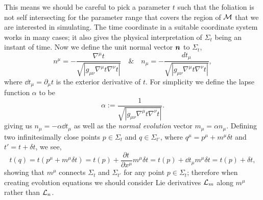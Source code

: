 This means we should be careful to pick a parameter $t$ such that the foliation is not self intersecting for the parameter range that covers the region of $\mathcal{M}$ that we are interested in simulating. The time coordinate in a suitable coordinate system works in many cases; it also gives the physical interpretation of $\Sigma_t$ being an instant of time. Now we define the unit normal vector $\boldsymbol{n}$ to $\Sigma_t$,
\begin{equation} n^\mu = -\frac{\nabla^\mu t}{\sqrt{|g_{\mu\nu}\nabla^\mu t \nabla^\nu t|}} \quad \& \quad  n_\mu = -\frac{dt_\mu}{\sqrt{|g_{\mu\nu}\nabla^\mu t \nabla^\nu t|}},\end{equation}
where $\dd t_\mu=\partial_\mu t$ is the exterior derivative of $t$.
For simplicity we define the lapse function $\alpha$ to be
\begin{equation}\alpha :=  \frac{1}{\sqrt{|g_{\mu\nu}\nabla^\mu t \nabla^\nu t|}}. \end{equation}
giving us $n_\mu = -\alpha \dd t_\mu$ as well as the {\it normal evolution} vector $m_\mu = \alpha n_\mu$. Defining two infinitesimally close points $p\in\Sigma_t$ and $q\in\Sigma_{t'}$, where $ q^\mu = p^\mu + m^\mu\delta t$ and $t' = t+ \delta t$, we see,
\begin{equation} t(q) = t(p^\mu +  m^\mu\delta t) = t(p) + \frac{\partial t^{\,}}{\partial x^\mu}m^\mu\delta t = t(p) + \dd t_\mu m^\mu \delta t =  t(p) + \delta t,\end{equation} 
showing that $m^\mu$ connects $\Sigma_t$ and $\Sigma_{t'}$ for any point $p\in \Sigma_t$; therefore when creating evolution equations we should consider Lie derivatives $\mathcal{L}_m$ along $m^\mu$ rather than $\mathcal{L}_n$.



